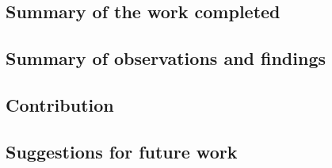 \subsection{Summary of the work completed}




\subsection{Summary of observations and findings}
    
    

\subsection{Contribution}
    
    

\subsection{Suggestions for future work}
    
    


